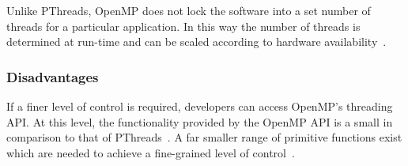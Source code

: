 \documentclass[10pt,twocolumn]{witseiepaper}
\begin{document}
\begin{appendix}
Unlike PThreads, OpenMP does not lock the software into a set number of threads for a particular application. In this way the number of threads is determined at run-time and can be scaled according to hardware availability~\cite{pthreadVSopen}.

\subsubsection{Disadvantages}
If a finer level of control is required, developers can access OpenMP's threading API. At this level, the functionality provided by the OpenMP API is a small in comparison to that of PThreads~\cite{pthreadVSopen}. A far smaller range of primitive functions exist which are needed to achieve a fine-grained level of control~\cite{pthreadVSopen}.
\end{appendix}
\end{document}
